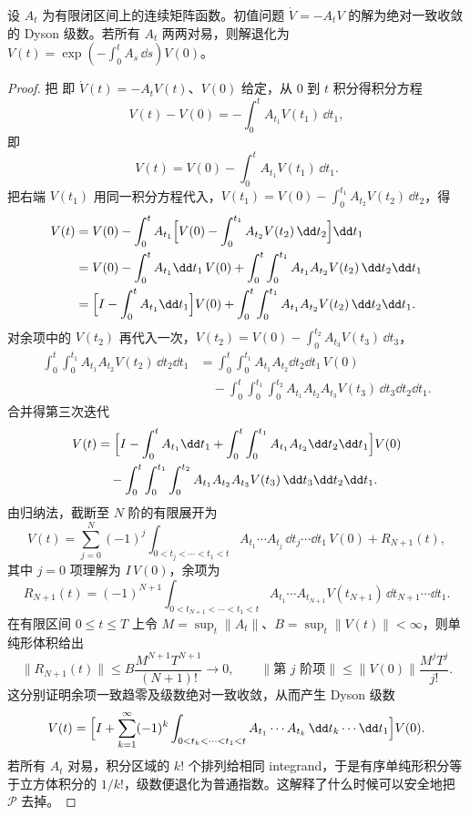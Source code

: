 \begin{proposition}[路径序指数的收敛构造]
设 $A_t$ 为有限闭区间上的连续矩阵函数。初值问题 $\dot V=-A_tV$ 的解为绝对一致收敛的 Dyson 级数。若所有 $A_t$ 两两对易，则解退化为 $V(t)=\exp(-\int_0^tA_s\,\dd s)V(0)$。
\end{proposition}
\begin{proof}
把 即 $\dot V(t)=-A_tV(t)$、$V(0)$ 给定，从 $0$ 到 $t$ 积分得积分方程
\begin{equation*}
V(t)-V(0)=-\int_0^tA_{t_1}V(t_1)\,\dd t_1,
\end{equation*}
即
\begin{equation*}
V(t)=V(0)-\int_0^tA_{t_1}V(t_1)\,\dd t_1.
\end{equation*}
把右端 $V(t_1)$ 用同一积分方程代入，$V(t_1)=V(0)-\int_0^{t_1}A_{t_2}V(t_2)\,\dd t_2$，得
\begin{align*}
V(t)
&=V(0)-\int_0^tA_{t_1}
 \Bigl[V(0)-\int_0^{t_1}A_{t_2}V(t_2)\,\dd t_2\Bigr]\dd t_1\\
&=V(0)-\int_0^tA_{t_1}\dd t_1\,V(0)
 +\int_0^t\int_0^{t_1}A_{t_1}A_{t_2}V(t_2)\,\dd t_2\dd t_1\\
&=\Bigl[I-\int_0^tA_{t_1}\dd t_1\Bigr]V(0)
 +\int_0^t\int_0^{t_1}A_{t_1}A_{t_2}V(t_2)\,\dd t_2\dd t_1.
\end{align*}
对余项中的 $V(t_2)$ 再代入一次，$V(t_2)=V(0)-\int_0^{t_2}A_{t_3}V(t_3)\,\dd t_3$，
\begin{align*}
\int_0^t\int_0^{t_1}A_{t_1}A_{t_2}V(t_2)\,\dd t_2\dd t_1
&=\int_0^t\int_0^{t_1}A_{t_1}A_{t_2}\dd t_2\dd t_1\,V(0)\\
&\quad-\int_0^t\int_0^{t_1}\int_0^{t_2}
 A_{t_1}A_{t_2}A_{t_3}V(t_3)\,\dd t_3\dd t_2\dd t_1.
\end{align*}
合并得第三次迭代
\begin{align*}
V(t)
&=\Bigl[I-\int_0^tA_{t_1}\dd t_1
 +\int_0^t\int_0^{t_1}A_{t_1}A_{t_2}\dd t_2\dd t_1\Bigr]V(0)\\
&\quad-\int_0^t\int_0^{t_1}\int_0^{t_2}
 A_{t_1}A_{t_2}A_{t_3}V(t_3)\,\dd t_3\dd t_2\dd t_1.
\end{align*}
由归纳法，截断至 $N$ 阶的有限展开为
\begin{equation*}
V(t)=\sum_{j=0}^{N}(-1)^j
\int_{0<t_j<\cdots<t_1<t}
A_{t_1}\cdots A_{t_j}\,\dd t_j\cdots\dd t_1\,V(0)+R_{N+1}(t),
\end{equation*}
其中 $j=0$ 项理解为 $I\,V(0)$，余项为
\[
R_{N+1}(t)=(-1)^{N+1}\int_{0<t_{N+1}<\cdots<t_1<t}
A_{t_1}\cdots A_{t_{N+1}}V(t_{N+1})\,\dd t_{N+1}\cdots\dd t_1.
\]
在有限区间 $0\le t\le T$ 上令 $M=\sup_t\|A_t\|$、$B=\sup_t\|V(t)\|<\infty$，则单纯形体积给出
\[
\|R_{N+1}(t)\|\le B\frac{M^{N+1}T^{N+1}}{(N+1)!}\longrightarrow0,
\qquad
\|\text{第 }j\text{ 阶项}\|\le\|V(0)\|\frac{M^jT^j}{j!}.
\]
这分别证明余项一致趋零及级数绝对一致收敛，从而产生 Dyson 级数
\begin{equation*}
V(t)=\Bigl[I+\sum_{k=1}^\infty(-1)^k
\int_{0<t_k<\cdots<t_1<t}
A_{t_1}\cdots A_{t_k}\,\dd t_k\cdots\dd t_1\Bigr]V(0).
\end{equation*}
若所有 $A_t$ 对易，积分区域的 $k!$ 个排列给相同 integrand，于是有序单纯形积分等于立方体积分的 $1/k!$，级数便退化为普通指数。这解释了什么时候可以安全地把 $\mathcal P$ 去掉。
\end{proof}
